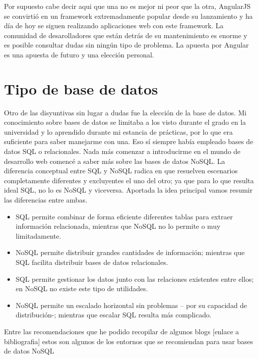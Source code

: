 Por supuesto cabe decir aqui que una no es mejor ni peor que la otra, AngularJS se convirtió en un framework extremadamente popular desde su lanzamiento y ha día de hoy se siguen realizando aplicaciones web con este framework. La comunidad de desarolladores que están detrás de su mantenimiento es enorme y es posible consultar dudas sin ningún tipo de problema. La apuesta por Angular es una apuesta de futuro y una elección personal.


  \section{Tipo de base de datos}\label{base de datos}
  
  Otro de las disyuntivas sin lugar a dudas fue la elección de la base de datos. Mi conocimiento sobre bases de datos se limitaba a los visto durante el grado en la universidad y lo aprendido durante mi estancia de prácticas, por lo que era suficiente para saber manejarme con una. Eso sí siempre había empleado bases de datos SQL o relacionales. Nada más comenzar a introducirme en el mundo de desarrollo web comencé a saber más sobre las bases de datos NoSQL. La diferencia conceptual entre SQL y NoSQL radica en que resuelven escenarios completamente diferentes y excluyentes el uno del otro; ya que para lo que resulta ideal SQL, no lo es NoSQL y viceversa. Aportada la idea principal vamos resumir las diferencias entre ambas. 
  
  \begin{itemize}
    \item SQL permite combinar de forma eficiente diferentes tablas para extraer información relacionada, mientras que NoSQL no lo permite o muy limitadamente.
    \item NoSQL permite distribuir grandes cantidades de información; mientras que SQL facilita distribuir bases de datos relacionales.
    \item SQL permite gestionar los datos junto con las relaciones existentes entre ellos; en NoSQL no existe este tipo de utilidades.
    \item NoSQL permite un escalado horizontal sin problemas – por su capacidad de distribución-; mientras que escalar SQL resulta más complicado.
   \end{itemize}
   
    Entre las recomendaciones que he podido recopilar de algunos blogs [enlace a bibliografia] estos son algunos de los entornos que  se recomiendan para usar bases de datos NoSQL
    
